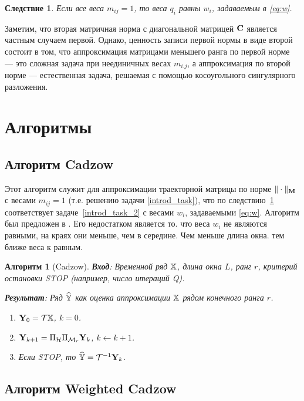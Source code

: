 \documentclass[12pt,a4paper,fleqn,leqno]{article}
\newtheorem{corollary}{Следствие}%
\newtheorem{algorithm}{Алгоритм}%
\begin{document}
\begin{corollary}
\label{cor:base_weights}
Если все веса $m_{ij}=1$, то веса $q_i$ равны $w_i$, задаваемым в \eqref{eq:w}.
\end{corollary}

Заметим, что вторая матричная норма с диагональной матрицей $\mathbf{C}$ является частным случаем первой.
Однако, ценность записи первой нормы в виде
второй состоит в том, что аппроксимация матрицами меньшего ранга по первой норме --- это сложная задача при неединичных весах
$m_{i.j}$, а аппроксимация по второй норме --- естественная задача, решаемая с помощью косоугольного сингулярного разложения.

\section{Алгоритмы}
\label{sec:alg}
\subsection{Алгоритм Cadzow}
Этот алгоритм служит для аппроксимации траекторной матрицы по норме $\|\cdot\|_{\mathbf{M}}$ с весами $m_{ij}=1$ (т.е. решению задачи \eqref{introd_task}), что по следствию~\ref{cor:base_weights} соответствует задаче~\eqref{introd_task_2} с весами $w_i$, задаваемыми \eqref{eq:w}.
Алгоритм был предложен в \cite{Cadzow1988}. Его недостатком является то. что веса $w_i$ не являются равными,
на краях они меньше, чем в середине. Чем меньше длина окна. тем ближе веса к равным.

\begin{algorithm}[Cadzow]
\textbf{Вход}: Временной ряд $\mathbb{X}$, длина окна $L$, ранг $r$,
критерий остановки STOP (например, число итераций Q).

\textbf{Результат}:
Ряд $\widehat{\mathbb{Y}}$ как оценка аппроксимации $\mathbb{X}$ рядом конечного ранга $r$.

\begin{enumerate}
\item
$\mathbf{Y}_0 = \mathcal{T} \mathbb{X}$, $k=0$.
\item
$\mathbf{Y}_{k+1} = \Pi_{\mathcal{H}}  \Pi_{\mathcal{M}_r} \mathbf{Y}_{k}$, $k\leftarrow k+1$.
\item
Если STOP, то $\widehat{\mathbb{Y}} = \mathcal{T}^{-1} \mathbf{Y}_k$.
\end{enumerate}
\end{algorithm}

\subsection{Алгоритм Weighted Cadzow}
\end{document}
